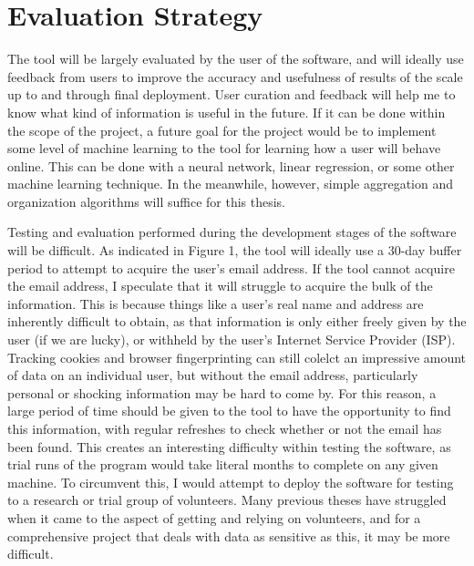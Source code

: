 \documentclass[11pt]{article}
\begin{document}
\vspace*{-.2in}
\section{Evaluation Strategy}
\label{sec:evaluate}
\vspace*{-.1in}


The tool will be largely evaluated by the user of the software, and will ideally use feedback from users to improve the accuracy and usefulness of results of the scale up to and through final deployment. User curation and feedback will help me to know what kind of information is useful in the future. If it can be done within the scope of the project, a future goal for the project would be to implement some level of machine learning to the tool for learning how a user will behave online. This can be done with a neural network, linear regression, or some other machine learning technique. In the meanwhile, however, simple aggregation and organization algorithms will suffice for this thesis.

Testing and evaluation performed during the development stages of the software will be difficult. As indicated in Figure 1, the tool will ideally use a 30-day buffer period to attempt to acquire the user's email address. If the tool cannot acquire the email address, I speculate that it will struggle to acquire the bulk of the information. This is because things like a user's real name and address are inherently difficult to obtain, as that information is only either freely given by the user (if we are lucky), or withheld by the user's Internet Service Provider (ISP). Tracking cookies and browser fingerprinting can still colelct an impressive amount of data on an individual user, but without the email address, particularly personal or shocking information may be hard to come by. For this reason, a large period of time should be given to the tool to have the opportunity to find this information, with regular refreshes to check whether or not the email has been found. This creates an interesting difficulty within testing the software, as trial runs of the program would take literal months to complete on any given machine. To circumvent this, I would attempt to deploy the software for testing to a research or trial group of volunteers. Many previous theses have struggled when it came to the aspect of getting and relying on volunteers, and for a comprehensive project that deals with data as sensitive as this, it may be more difficult. 
\end{document}
